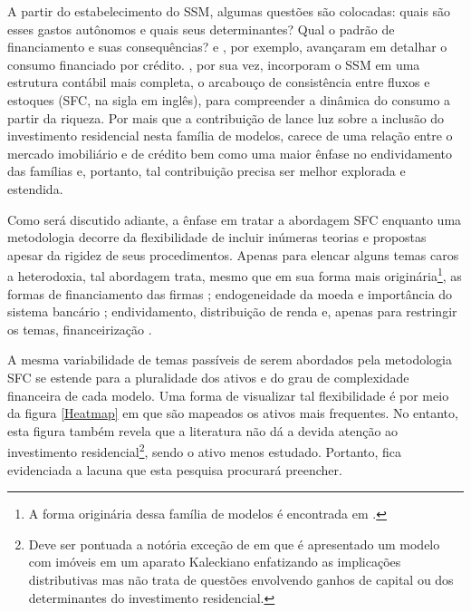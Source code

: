 A partir do estabelecimento do SSM, algumas questões são colocadas: quais são esses gastos autônomos e quais seus determinantes? Qual o padrão de financiamento e suas consequências? \textcite{pariboni_household_2016} e \textcite{fagundes_dinamica_2017}, por exemplo, avançaram em detalhar o consumo financiado por crédito.  \textcite{brochier_supermultiplier_2018}, por sua vez, incorporam o SSM em uma estrutura contábil mais completa, o arcabouço de consistência entre fluxos e estoques (SFC, na sigla em inglês), para compreender a dinâmica do consumo a partir da riqueza. Por mais que a contribuição de \textcite{da_silveira_investimento_2019} lance luz sobre a inclusão do investimento residencial nesta família de modelos, carece de uma relação entre o mercado imobiliário e de crédito bem como uma maior ênfase no endividamento das famílias e, portanto, tal contribuição precisa ser melhor explorada e estendida.

Como será discutido adiante, a ênfase em tratar a abordagem SFC enquanto uma metodologia decorre da flexibilidade de incluir inúmeras teorias e propostas apesar da rigidez de seus procedimentos. Apenas para elencar alguns temas caros a heterodoxia, tal abordagem trata, mesmo que em sua forma mais originária\footnote{A forma originária dessa família de modelos é encontrada em \textcite{godley_macroeconomics_1983}.}, as formas de financiamento das firmas \cites{asimakopulos_kalecki_1983}{skott_finance_1988}{messori_financing_1991}; endogeneidade da moeda e importância do sistema bancário \cites{messori_financing_1991}{dow_horizontalism:_1996}{arestis_theoretical_1996}{godley_money_1999}; endividamento, distribuição de renda e, apenas para restringir os temas, financeirização \cites{palley_inside_1996}{wolfson_irving_1996}{palley_money_1997}{palley_financial_2002}{dos_santos_revisiting_2009}{palley_inside_2010}{hein_finance-dominated_2012}.

A mesma variabilidade de temas passíveis de serem abordados pela metodologia SFC se estende para a pluralidade dos ativos e do grau de complexidade financeira de cada modelo. Uma forma de visualizar tal flexibilidade é por meio da figura \ref{Heatmap} em que são mapeados os ativos mais frequentes. No entanto, esta figura também revela que a literatura não dá a devida atenção ao investimento residencial\footnote{Deve ser pontuada a notória exceção de \textcite{zezza_u.s._2008} em que é apresentado um modelo com imóveis em um aparato Kaleckiano enfatizando as implicações distributivas mas não trata de questões envolvendo ganhos de capital ou dos determinantes do investimento residencial.}, sendo o ativo menos estudado. Portanto, fica evidenciada a lacuna que esta pesquisa procurará preencher.


